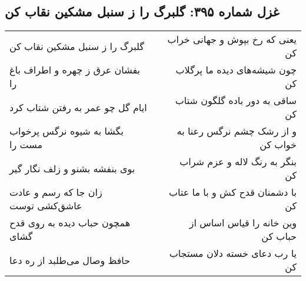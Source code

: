 \begin{center}
\section*{غزل شماره ۳۹۵: گلبرگ را ز سنبل مشکین نقاب کن}
\label{sec:sh395}
\begin{longtable}{l p{0.5cm} r}
گلبرگ را ز سنبل مشکین نقاب کن
&&
یعنی که رخ بپوش و جهانی خراب کن
\\
بفشان عرق ز چهره و اطراف باغ را
&&
چون شیشه‌های دیده ما پرگلاب کن
\\
ایام گل چو عمر به رفتن شتاب کرد
&&
ساقی به دور باده گلگون شتاب کن
\\
بگشا به شیوه نرگس پرخواب مست را
&&
و از رشک چشم نرگس رعنا به خواب کن
\\
بوی بنفشه بشنو و زلف نگار گیر
&&
بنگر به رنگ لاله و عزم شراب کن
\\
زان جا که رسم و عادت عاشق‌کشی توست
&&
با دشمنان قدح کش و با ما عتاب کن
\\
همچون حباب دیده به روی قدح گشای
&&
وین خانه را قیاس اساس از حباب کن
\\
حافظ وصال می‌طلبد از ره دعا
&&
یا رب دعای خسته دلان مستجاب کن
\\
\end{longtable}
\end{center}
